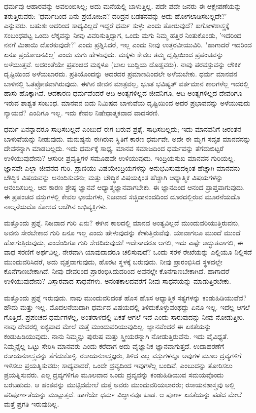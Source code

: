 ಧರ್ಮವು ಆಹಾರವನ್ನು ಅವಲಂಬಿಸಿಲ್ಲ; ಅದು ಮನೆಯಲ್ಲಿ ಬಾಳುತ್ತಿಲ್ಲ. ಪದೇ ಪದೇ ಜನರು ಈ ಆಕ್ಷೇಪಣೆಯನ್ನು ತರುತ್ತಿರುವರು: 'ಧರ್ಮದಿಂದ ಏನು ಪ್ರಯೋಜನ? ದರಿದ್ರನ ಬಡತನವನ್ನು ಅದು ಹೋಗಲಾಡಿಸಬಲ್ಲದೇ?' ಎನ್ನುವರು. ಬಹುಶಃ ಅದರಿಂದ ಸಾಧ್ಯವಿಲ್ಲದೆ ಇದ್ದರೆ ಧರ್ಮ ಸುಳ್ಳು ಎಂದು ತೋರುವುದೆ? ಖಗೋಳಶಾಸ್ತ್ರಕ್ಕೆ ಸಂಬಂಧಪಟ್ಟ ಒಂದು ಲೆಕ್ಕವನ್ನು ನೀವು ವಿವರಿಸುತ್ತಿದ್ದಾಗ, ಒಂದು ಮಗು ನಿಮ್ಮ ಹತ್ತಿರ ನಿಂತುಕೊಂಡು, 'ಇದರಿಂದ ನನಗೆ ಮಿಠಾಯಿ ದೊರಕುವುದೇ?' ಎಂದು ಪ್ರಶ್ನಿಸಿದರೆ, ಇಲ್ಲ ಎಂದು ನೀವು ಉತ್ತರವೀಯುವಿರಿ. "ಹಾಗಾದರೆ ಇದರಿಂದ ಏನೂ ಪ್ರಯೋಜನವಿಲ್ಲ' ಎಂದು ಮಗು ಹೇಳುವುದು. ಮಕ್ಕಳು ಕೇವಲ ತಮ್ಮ ದೃಷ್ಟಿಯಿಂದ ಪ್ರಪಂಚವನ್ನು ಅಳೆಯುತ್ತವೆ. ಅದರಂತೆಯೇ ಪ್ರಪಂಚದ ಮಕ್ಕಳೂ (ಬಾಲ ಬುದ್ದಿಯ ದೊಡ್ಡವರು). ನಾವು ಪರವಸ್ತುವನ್ನು ಲೌಕಿಕ ದೃಷ್ಟಿಯಿಂದ ಅಳೆಯಬಾರದು. ಪ್ರತಿಯೊಂದನ್ನು ಅದರದರ ಪ್ರಮಾಣದಿಂದಲೇ ಅಳೆಯಬೇಕು. ಧರ್ಮ ಮಾನವನ ಬಾಳಿನಲ್ಲಿ ಓತಪ್ರೋತವಾಗಿರುವುದು. ಈಗಿನ ಜೀವನ ಮಾತ್ರವಲ್ಲ, ಭೂತ ಭವಿಷ್ಯತ್ ವರ್ತಮಾನ ಕಾಲಗಳೆಲ್ಲ ಇದರಲ್ಲಿ ಹಾಸು ಹೊಕ್ಕಾಗಿವೆ. ಆದಕಾರಣ ಧರ್ಮವೆಂದರೆ ಆದಿ ಅಂತ್ಯಗಳಿಲ್ಲದ ಜೀವನಿಗೂ, ಆದಿ ಅಂತ್ಯಗಳಿಲ್ಲದ ದೇವರಿಗೂ ಇರುವ ಶಾಶ್ವತ ಸಂಬಂಧ. ಮಾನವನ ಐದು ನಿಮಿಷದ ಬಾಳುವೆಯ ದೃಷ್ಟಿಯಿಂದ ಅದರ ಪ್ರಭಾವವನ್ನು ಅಳೆಯುವುದು ನ್ಯಾಯವೆ? ಎಂದಿಗೂ ಇಲ್ಲ. ಇದು ಕೇವಲ ನಿಷೇಧಾತ್ಮಕವಾದ ವಾದಸರಣಿ.

ಧರ್ಮ ಏನನ್ನಾದರೂ ಸಾಧಿಸಬಲ್ಲದೆ ಎಂಬುದೆ ಈಗ ಬರುವ ಪ್ರಶ್ನೆ. ಸಾಧಿಸಬಲ್ಲದು; ಇದು ಮಾನವನಿಗೆ ಚಿರಂತನ ಬಾಳುವೆಯನ್ನು ನೀಡುವುದು. ಮನುಷ್ಯನು ಈಗಿರುವ ಸ್ಥಿತಿಗೆ ಕಾರಣ ಧರ್ಮವೇ. ಅದೇ ಈ ಮೃಗ ಸದೃಶ ಮಾನವನನ್ನು ದೇವನನ್ನಾಗಿ ಮಾಡಬಲ್ಲದು. ಇದು ಧರ್ಮಕ್ಕೆ ಸಾಧ್ಯ. ಮಾನವ ಸಮಾಜದಿಂದ ಧರ್ಮವನ್ನು ತೆಗೆದುಬಿಟ್ಟರೆ ಉಳಿಯುವುದೇನು? ಆಸುರೀ ಪ್ರವೃತ್ತಿಗಳ ಸಮೂಹವೇ ಉಳಿಯುವುದು. ಇಂದ್ರಿಯಸುಖ ಮಾನವನ ಗುರಿಯಲ್ಲ. ಜ್ಞಾನವೇ ಎಲ್ಲಾ ಜೀವನದ ಗುರಿ. ಪ್ರಾಣಿಯು ವಿಷಯೇಂದ್ರಿಯಗಳನ್ನು ಅನುಭವಿಸುವುದಕ್ಕಿಂತ ಹೆಚ್ಚಾಗಿ ಮಾನವನು ಬೌದ್ಧಿಕ ವಿಷಯವನ್ನು ಆನಂದಿಸುವನು; ಮತ್ತು ಬೌದ್ಧಿಕ ವಿಷಯಕ್ಕಿಂತ ಹೆಚ್ಚಾಗಿ ಆಧ್ಯಾತ್ಮಿಕ ವಿಷಯಗಳನ್ನು ಆನಂದಿಸಬಲ್ಲ. ಆದ ಕಾರಣ ಶ್ರೇಷ್ಠ ಜ್ಞಾನವೆ ಆಧ್ಯಾತ್ಮಜ್ಞಾನವಾಗಬೇಕು. ಈ ಜ್ಞಾನದಿಂದ ಆನಂದ ಪ್ರಾಪ್ತವಾಗುವುದು. ಈ ಪ್ರಪಂಚದ ವಸ್ತುಗಳಲ್ಲಿ ಕೇವಲ ಛಾಯೆಗಳು, ನಿಜವಾದ ಸಚ್ಚಿದಾನಂದದಿಂದ ದೂರದಲ್ಲಿರುವ ಮೂರನೆಯದೊ ನಾಲ್ಕನೆಯದೊ ಕೋಶದ ಆಚೆಗಿನ ಅಭಿವ್ಯಕ್ತಿಗಳು.

ಮತ್ತೊಂದು ಪ್ರಶ್ನೆ. ನಿಜವಾದ ಗುರಿ ಏನು? ಈಗಿನ ಕಾಲದಲ್ಲಿ ಮಾನವ ಅಂತ್ಯವಿಲ್ಲದೆ ಮುಂದುವರಿಯುತ್ತಿರುವನು, ಅವನು ಸೇರಬೇಕಾದ ಗುರಿ ಏನೂ ಇಲ್ಲ ಎಂದು ಹೇಳುವುದನ್ನು ಕೇಳುತ್ತಿರುವೆವು. ಯಾವಾಗಲೂ ಮುಂದೆ ಮುಂದೆ ಹೋಗುತ್ತಿರುವುದು, ಎಂದೆಂದಿಗೂ ಗುರಿ ಸೇರದಿರುವುದು! ಇದೇನಾದರೂ ಆಗಲಿ, ಇದು ಎಷ್ಟೇ ಅದ್ಭುತವಾಗಲಿ, ಈ ವಾಧ ಸರಣಿಗೆ ಅರ್ಥವಿಲ್ಲ. ನೇರವಾಗಿ ಯಾವುದಾದರೂ ಚಲಿಸುವುದೆ? ಒಂದು ಸರಳ ರೇಖೆಯನ್ನು ಎಲ್ಲಿಯೂ ನಿಲ್ಲಿಸದೆ ಮುಂದುವರಿಸಿದರೆ, ಅದು ವೃತ್ತವಾಗುವುದು, ಹೊರಟ ಸ್ಥಳಕ್ಕೆ ಬರುವುದು. ನೀವು ಪ್ರಾರಂಭಿಸಿದ ಸ್ಥಳದಲ್ಲೇ ಕೊನೆಗಾಣಬೇಕಾಗಿದೆ. ನೀವು ದೇವರಿಂದ ಪ್ರಾರಂಭಿಸಿದುದರಿಂದ ಅವನಲ್ಲೇ ಕೊನೆಗಾಣಬೇಕಾಗಿದೆ. ಹಾಗಾದರೆ ಉಳಿಯುವುದೇನು? ವಿಸ್ತಾರವಾದ ಸಾಧನೆಗಳು. ಅನಂತಕಾಲದವರೆಗೆ ನೀವು ಸಾಧನೆಯನ್ನು ಮಾಡುತ್ತಿರಬೇಕು.

ಮತ್ತೊಂದು ಪ್ರಶ್ನೆ ಇರುವುದು. ನಾವು ಮುಂದುವರಿದಂತೆ ಹೊಸ ಹೊಸ ಆಧ್ಯಾತ್ಮಿಕ ಸತ್ಯಗಳನ್ನು ಕಂಡುಹಿಡಿಯುವೆವೆ? ಹೌದು ಮತ್ತು ಇಲ್ಲ. ಮೊದಲನೆಯದಾಗಿ ಧರ್ಮದ ವಿಷಯದಲ್ಲಿ ತಿಳಿದುಕೊಳ್ಳುವಂಥದ್ದು ಏನೂ ಇಲ್ಲ. ಇದೆಲ್ಲ ಆಗಲೆ ಗೊತ್ತಿದೆ. ಪ್ರಪಂಚದ ಧರ್ಮಗಳೆಲ್ಲ, ಅಂತರಾಳದಲ್ಲಿ ಏಕತೆ ಆಗಲೆ ಇದೆ ಎಂದು ಸಾರುವುದನ್ನು ನೀವು ನೋಡುತ್ತೀರಿ. ನಾವು ದೇವರಲ್ಲಿ ಐಕ್ಯವಾದ ಮೇಲೆ ಮತ್ತೆ ಮುಂದುವರಿಯುವುದಿಲ್ಲ. ಜ್ಞಾನವೆಂದರೆ ಈ ಏಕತೆಯನ್ನು ಕಂಡುಹಿಡಿಯುವುದು. ನಾನು ನಿಮ್ಮನ್ನು ಪುರುಷ ಮತ್ತು ಸ್ತ್ರೀಯರನ್ನಾಗಿ ನೋಡುತ್ತಿರುವೆನು. ಇದು ವೈವಿಧ್ಯತೆ. ನಿಮ್ಮನ್ನೆಲ್ಲ ಒಟ್ಟು ಸೇರಿಸಿ ಮಾನವರು ಎಂದು ಕರೆದಾಗ ಅದು ವೈಜ್ಞಾನಿಕ ಜ್ಞಾನವಾಗುತ್ತದೆ. ಉದಾಹರಣೆಗೆ ರಸಾಯನಶಾಸ್ತ್ರವನ್ನು ತೆಗೆದುಕೊಳ್ಳಿ. ರಸಾಯನಶಾಸ್ತ್ರಜ್ಞರು, ತಿಳಿದ ಎಲ್ಲ ವಸ್ತುಗಳನ್ನೂ ಅವುಗಳ ಮೂಲ ದ್ರವ್ಯಗಳಿಗೆ ಇಳಿಸಲು ಪ್ರಯತ್ನಿಸುವರು; ಸಾಧ್ಯವಾದರೆ, ಒಂದೇ ದ್ರವ್ಯದಿಂದ ಇವುಗಳೆಲ್ಲ ಬಂದಿವೆ, ಎಂಬುದನ್ನು ತೋರಿಸಲು ಪ್ರಯತ್ನಿಸುವರು. ಎಲ್ಲ ದ್ರವ್ಯಗಳಿಗೂ ಮೂಲವಾದ ಒಂದು ದ್ರವ್ಯವನ್ನು ಕಂಡುಹಿಡಿಯುವ ಸಮಯವೊಂದು ಬರಬಹುದು. ಆ ಹಂತವನ್ನು ಮುಟ್ಟಿದಮೇಲೆ ಮತ್ತೆ ಅವರು ಮುಂದುವರಿಯಲಾರರು; ರಸಾಯನಶಾಸ್ತ್ರವು ಅಲ್ಲಿ ಪರಿಪೂರ್ಣತೆಯನ್ನು ಮುಟ್ಟುತ್ತದೆ. ಹಾಗೆಯೇ ಧರ್ಮ ವಿಜ್ಞಾನವೂ ಕೂಡ. ಆ ಪೂರ್ಣ ಏಕತೆಯನ್ನು ಪಡೆದ ಮೇಲೆ ಮತ್ತೆ ಪ್ರಗತಿ ಇರುವುದಿಲ್ಲ.

